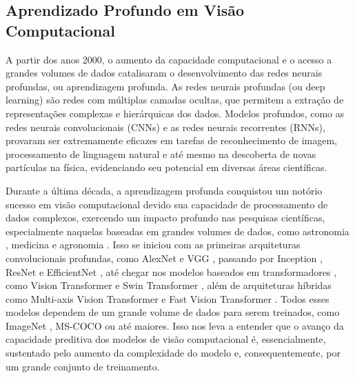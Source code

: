 \subsection{Aprendizado Profundo em Visão Computacional}
\label{sec:dl-cv}
A partir dos anos 2000, o aumento da capacidade computacional e o acesso a grandes volumes de dados catalisaram o desenvolvimento das redes neurais profundas, ou aprendizagem profunda. As redes neurais profundas (ou deep learning) são redes com múltiplas camadas ocultas, que permitem a extração de representações complexas e hierárquicas dos dados. Modelos profundos, como as redes neurais convolucionais (CNNs) e as redes neurais recorrentes (RNNs), provaram ser extremamente eficazes em tarefas de reconhecimento de imagem, processamento de linguagem natural e até mesmo na descoberta de novas partículas na física, evidenciando seu potencial em diversas áreas científicas.

Durante a última década, a aprendizagem profunda conquistou um notório sucesso em visão computacional devido sua capacidade de processamento de dados complexos, exercendo um impacto profundo nas pesquisas científicas, especialmente naquelas baseadas em grandes volumes de dados, como astronomia \cite{astro1, astro2}, medicina \cite{VGG16Ex03, InceptionResNetV2Ex03, InceptionResNetV2Ex02} e agronomia \cite{EfficientNetEx03, VGG16Ex02}. Isso se iniciou com as primeiras arquiteturas convolucionais profundas, como AlexNet \cite{alexnet-x} e VGG \cite{vgg16-x}, passando por Inception \cite{inception-x}, ResNet \cite{resnet-x} e EfficientNet \cite{efficientnet-x}, até chegar nos modelos baseados em transformadores \cite{transformers-x}, como Vision Transformer \cite{vit} e Swin Transformer \cite{swin}, além de arquiteturas híbridas como Multi-axis Vision Transformer \cite{maxvit} e Fast Vision Transformer \cite{fastvit}. Todos esses modelos dependem de um grande volume de dados para serem treinados, como ImageNet \cite{imagenet-x}, MS-COCO \cite{ms-coco} ou até maiores. Isso nos leva a entender que o avanço da capacidade preditiva dos modelos de visão computacional é, essencialmente, sustentado pelo aumento da complexidade do modelo e, consequentemente, por um grande conjunto de treinamento.


